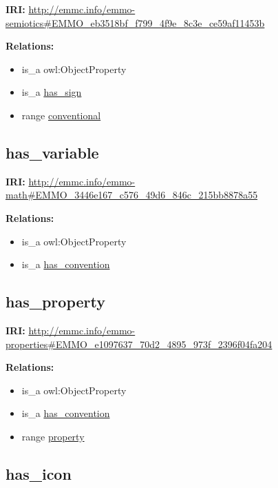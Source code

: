 \documentclass[a4paper,]{report}
\providecommand{\tightlist}{%
  \setlength{\itemsep}{0pt}\setlength{\parskip}{0pt}}
\begin{document}
\textbf{IRI:}
\url{http://emmc.info/emmo-semiotics\#EMMO_eb3518bf_f799_4f9e_8c3e_ce59af11453b}

\textbf{Relations:}

\begin{itemize}
\tightlist
\item
  is\_a owl:ObjectProperty
\item
  is\_a \protect\hyperlink{has_sign}{has\_sign}
\item
  range \protect\hyperlink{conventional}{conventional}
\end{itemize}

\hypertarget{has_variable}{%
\subsection{has\_variable}\label{has_variable}}

\textbf{IRI:}
\url{http://emmc.info/emmo-math\#EMMO_3446e167_c576_49d6_846c_215bb8878a55}

\textbf{Relations:}

\begin{itemize}
\tightlist
\item
  is\_a owl:ObjectProperty
\item
  is\_a \protect\hyperlink{has_convention}{has\_convention}
\end{itemize}

\hypertarget{has_property}{%
\subsection{has\_property}\label{has_property}}

\textbf{IRI:}
\url{http://emmc.info/emmo-properties\#EMMO_e1097637_70d2_4895_973f_2396f04fa204}

\textbf{Relations:}

\begin{itemize}
\tightlist
\item
  is\_a owl:ObjectProperty
\item
  is\_a \protect\hyperlink{has_convention}{has\_convention}
\item
  range \protect\hyperlink{property}{property}
\end{itemize}

\hypertarget{has_icon}{%
\subsection{has\_icon}\label{has_icon}}
\end{document}
